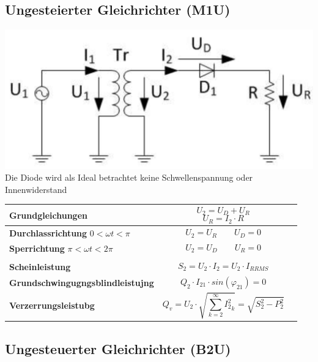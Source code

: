 \subsection{Ungesteierter Gleichrichter (M1U)}
\includegraphics[width=0.4\linewidth]{images/UGRM1U}
Die Diode wird als Ideal betrachtet \rightarrow keine Schwellenspannung oder Innenwiderstand

\begin{longtable}{| p{} | p{} | p{} |} %
    \hline
    \textbf{Grundgleichungen}&
    \[ U_2 = U_D + U_R \]
    \[ U_R = I_2 \cdot R \]&\\
    \hline
    \textbf{Durchlassrichtung}\newline
    $ 0 < \omega t < \pi $&
    \[ U_2 = U_R \qquad U_D = 0 \]&\\
    \hline   
    \textbf{Sperrichtung}\newline
    $ \pi < \omega t < 2\pi $&
    \[ U_2=U_D \qquad U_R = 0 \]&\\
    \hline
    
    &
    &
    \\ \hline
    
    \textbf{Scheinleistung}&
    \[ S_2 = U_2 \cdot I_2 = U_2 \cdot I_{R RMS} \]&
    \\ \hline
        
    \textbf{Grundschwingugngsblindleistujng}&
    \[ Q_2\cdot I_{2 1} \cdot sin(\varphi_{2 1}) = 0 \]&
    \\ \hline    
    
        
    \textbf{Verzerrungsleistubg}&
    \[ Q_v = U_2 \cdot \sqrt{\sum_{k=2}^{\infty} {I_2^2}_k} = \sqrt{S_2^2 - P_2^2} \]&
    \\ \hline

\end{longtable}
%

\subsection{Ungesteuerter Gleichrichter (B2U)}


\clearpage
